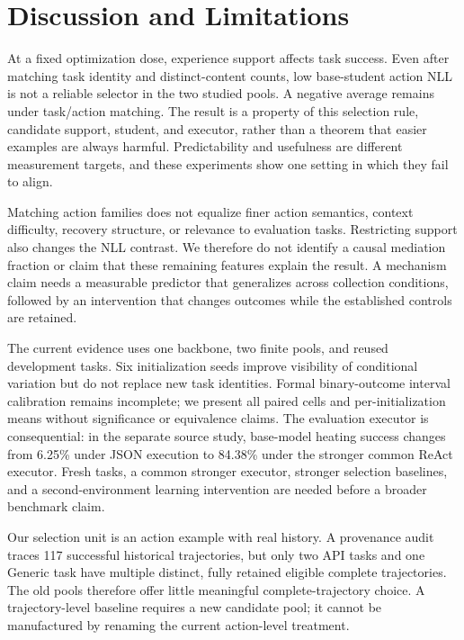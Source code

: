 \section{Discussion and Limitations}
\label{sec:discussion}
At a fixed optimization dose, experience support affects task success. Even after matching task identity and distinct-content counts, low base-student action NLL is not a reliable selector in the two studied pools. A negative average remains under task/action matching. The result is a property of this selection rule, candidate support, student, and executor, rather than a theorem that easier examples are always harmful. Predictability and usefulness are different measurement targets, and these experiments show one setting in which they fail to align.

Matching action families does not equalize finer action semantics, context difficulty, recovery structure, or relevance to evaluation tasks. Restricting support also changes the NLL contrast. We therefore do not identify a causal mediation fraction or claim that these remaining features explain the result. A mechanism claim needs a measurable predictor that generalizes across collection conditions, followed by an intervention that changes outcomes while the established controls are retained.

The current evidence uses one backbone, two finite pools, and reused development tasks. Six initialization seeds improve visibility of conditional variation but do not replace new task identities. Formal binary-outcome interval calibration remains incomplete; we present all paired cells and per-initialization means without significance or equivalence claims. The evaluation executor is consequential: in the separate source study, base-model heating success changes from 6.25\% under JSON execution to 84.38\% under the stronger common ReAct executor. Fresh tasks, a common stronger executor, stronger selection baselines, and a second-environment learning intervention are needed before a broader benchmark claim.

Our selection unit is an action example with real history. A provenance audit traces 117 successful historical trajectories, but only two API tasks and one Generic task have multiple distinct, fully retained eligible complete trajectories. The old pools therefore offer little meaningful complete-trajectory choice. A trajectory-level baseline requires a new candidate pool; it cannot be manufactured by renaming the current action-level treatment.

